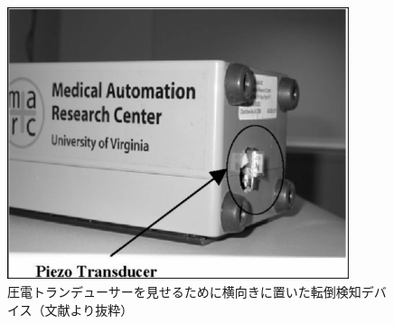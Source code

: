 \begin{figure}[htbp]
  \caption{圧電トランデューサーを見せるために横向きに置いた転倒検知デバイス（文献\cite{floor_vibration_fall_detector}より抜粋）}
  \label{fig:floor_vibration_fall_detector}
  \begin{center}
    \includegraphics[bb=0 0 1000 800,width=10cm]{assets/floor_vibration_fall_detector.png}
  \end{center}
\end{figure}
